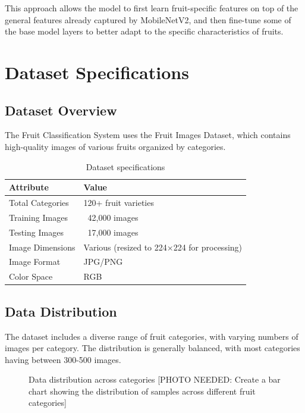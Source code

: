\documentclass[11pt,a4paper]{report}
\begin{document}
This approach allows the model to first learn fruit-specific features on top of the general features already captured by MobileNetV2, and then fine-tune some of the base model layers to better adapt to the specific characteristics of fruits.

\chapter{Dataset Specifications}

\section{Dataset Overview}
The Fruit Classification System uses the Fruit Images Dataset, which contains high-quality images of various fruits organized by categories.

\begin{table}[H]
    \centering
    \begin{tabular}{ll}
        \toprule
        \textbf{Attribute} & \textbf{Value} \\
        \midrule
        Total Categories & 120+ fruit varieties \\
        Training Images & ~42,000 images \\
        Testing Images & ~17,000 images \\
        Image Dimensions & Various (resized to 224×224 for processing) \\
        Image Format & JPG/PNG \\
        Color Space & RGB \\
        \bottomrule
    \end{tabular}
    \caption{Dataset specifications}
    \label{tab:dataset_specs}
\end{table}

\section{Data Distribution}
The dataset includes a diverse range of fruit categories, with varying numbers of images per category. The distribution is generally balanced, with most categories having between 300-500 images.

\begin{figure}[H]
    \centering
    \fbox{\rule{0pt}{8cm}\rule{12cm}{0pt}}
    \caption{Data distribution across categories [PHOTO NEEDED: Create a bar chart showing the distribution of samples across different fruit categories]}
    \label{fig:data_distribution}
\end{figure}
\end{document}
